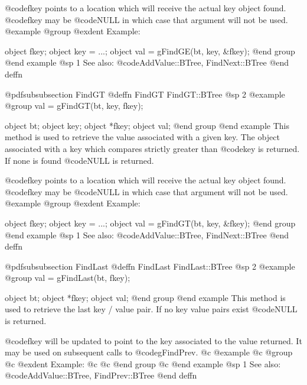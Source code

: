 @code{fkey} points to a location which will receive the actual key
object found.  @code{fkey} may be @code{NULL} in which case that
argument will not be used.
@example
@group
@exdent Example:

object  fkey;
object  key = ...;
object  val = gFindGE(bt, key, &fkey);
@end group
@end example
@sp 1
See also:  @code{AddValue::BTree, FindNext::BTree}
@end deffn







@pdfsubsubsection {FindGT}
@deffn {FindGT} FindGT::BTree
@sp 2
@example
@group
val = gFindGT(bt, key, fkey);

object  bt;
object  key;
object  *fkey;
object  val;
@end group
@end example
This method is used to retrieve the value associated with a given key.
The object associated with a key which compares strictly greater than
@code{key} is returned.  If none is found @code{NULL} is returned.

@code{fkey} points to a location which will receive the actual key
object found.  @code{fkey} may be @code{NULL} in which case that
argument will not be used.
@example
@group
@exdent Example:

object  fkey;
object  key = ...;
object  val = gFindGT(bt, key, &fkey);
@end group
@end example
@sp 1
See also:  @code{AddValue::BTree, FindNext::BTree}
@end deffn















@pdfsubsubsection {FindLast}
@deffn {FindLast} FindLast::BTree
@sp 2
@example
@group
val = gFindLast(bt, fkey);

object  bt;
object  *fkey;
object  val;
@end group
@end example
This method is used to retrieve the last key / value pair.  If no key
value pairs exist @code{NULL} is returned.

@code{fkey} will be updated to point to the key associated to the value
returned.  It may be used on subsequent calls to @code{gFindPrev}.
@c @example
@c @group
@c @exdent Example:
@c 
@c @end group
@c @end example
@sp 1
See also:  @code{AddValue::BTree, FindPrev::BTree}
@end deffn
























